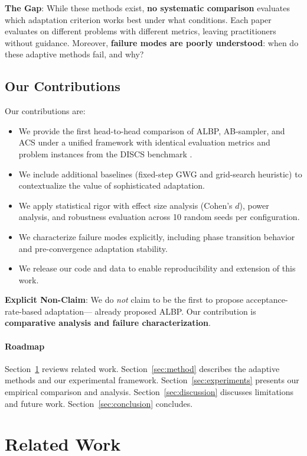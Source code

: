 \documentclass{article}
\begin{document}
\textbf{The Gap}: While these methods exist, \textbf{no systematic comparison} evaluates which adaptation criterion works best under what conditions. Each paper evaluates on different problems with different metrics, leaving practitioners without guidance. Moreover, \textbf{failure modes are poorly understood}: when do these adaptive methods fail, and why?

\subsection{Our Contributions}

Our contributions are:
\begin{itemize}
    \item We provide the first head-to-head comparison of ALBP, AB-sampler, and ACS under a unified framework with identical evaluation metrics and problem instances from the DISCS benchmark \citep{goshvadi2023discs}.
    \item We include additional baselines (fixed-step GWG and grid-search heuristic) to contextualize the value of sophisticated adaptation.
    \item We apply statistical rigor with effect size analysis (Cohen's $d$), power analysis, and robustness evaluation across 10 random seeds per configuration.
    \item We characterize failure modes explicitly, including phase transition behavior and pre-convergence adaptation stability.
    \item We release our code and data to enable reproducibility and extension of this work.
\end{itemize}

\textbf{Explicit Non-Claim}: We do \emph{not} claim to be the first to propose acceptance-rate-based adaptation---\citet{sun2022optimal} already proposed ALBP. Our contribution is \textbf{comparative analysis and failure characterization}.

\paragraph{Roadmap} Section~\ref{sec:related} reviews related work. Section~\ref{sec:method} describes the adaptive methods and our experimental framework. Section~\ref{sec:experiments} presents our empirical comparison and analysis. Section~\ref{sec:discussion} discusses limitations and future work. Section~\ref{sec:conclusion} concludes.

\section{Related Work}
\label{sec:related}
\end{document}
